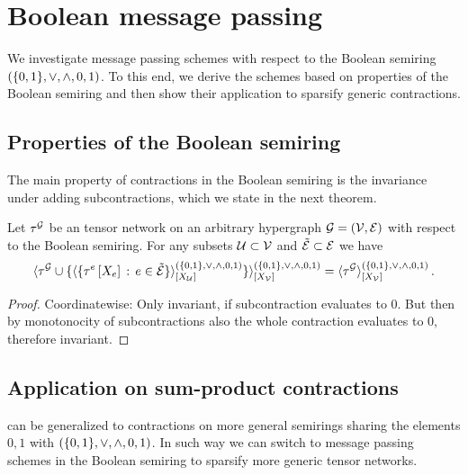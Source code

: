 \section{Boolean message passing}\label{sec:booleanMessagePassing}

We investigate message passing schemes with respect to the Boolean semiring $(\{0,1\},\lor,\land,0,1)$.
To this end, we derive the schemes based on properties of the Boolean semiring and then show their application to sparsify generic contractions.

\subsection{Properties of the Boolean semiring}

The main property of contractions in the Boolean semiring is the invariance under adding subcontractions, which we state in the next theorem.

\begin{theorem}\label{the:booleanContractionInvariance}
    Let $\tau^{\mathcal{G}}$ be an tensor network on an arbitrary hypergraph $\mathcal{G}=(\mathcal{V},\mathcal{E})$ with respect to the Boolean semiring.
    For any subsets $\mathcal{U}\subset\mathcal{V}$ and $\tilde{\mathcal{E}}\subset\mathcal{E}$ we have
    \begin{align*}
        \langle\tau^{\mathcal{G}}\cup
            \{\langle\{\tau^{e}\left[X_{e}\right]\,:\,e\in\tilde{\mathcal{E}}\}\rangle^{(\{0,1\},\lor,\land,0,1)}_{[X_{\mathcal{U}}]}\}
        \rangle^{(\{0,1\},\lor,\land,0,1)}_{[X_{\mathcal{V}}]}
        = \langle\tau^{\mathcal{G}}\rangle^{(\{0,1\},\lor,\land,0,1)}_{[X_{\mathcal{V}}]} \, .
    \end{align*}
\end{theorem}
\begin{proof}
    Coordinatewise:
    Only invariant, if subcontraction evaluates to $0$.
    But then by monotonocity of subcontractions also the whole contraction evaluates to $0$, therefore invariant.
\end{proof}

\subsection{Application on sum-product contractions}

 can be generalized to contractions on more general semirings sharing the elements $0,1$ with $(\{0,1\},\lor,\land,0,1)$.
In such way we can switch to message passing schemes in the Boolean semiring to sparsify more generic tensor networks.


